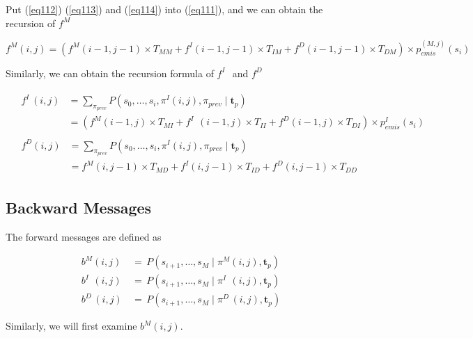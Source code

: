 \documentclass[10pt]{article}
\begin{document}
    Put (\ref{eq112}) (\ref{eq113}) and (\ref{eq114}) into (\ref{eq111}), and we can obtain the recursion of $f^{M}$
    
    \begin{equation} \label{eq115}
      f^{M}(i, j) = (f^{M}(i-1, j-1) \times T_{MM}  + f^{I}(i-1, j-1) \times T_{IM} + f^{D}(i-1, j-1) \times T_{DM}) \times p_{emis}^{(M, j)}(s_{i})
    \end{equation}

    Similarly, we can obtain the recursion formula of $f^{I\;\;}$ and $f^{D\;}$

    \begin{align}
      &\begin{aligned} \label{eq116}
        f^{I\;}(i, j) &= \sum\nolimits_{\pi_{prev}} P(s_0, \dots,s_{i}, \pi^{I}(i, j), \pi_{prev} \;|\; \mathbf{t}_{p}) \\
                    &= (f^{M}(i-1, j) \times T_{MI}  + f^{I\;\;}(i-1, j) \times T_{II} + f^{D}(i-1, j) \times T_{DI}) \times p_{emis}^{I}(s_{i})
      \end{aligned} \\
      &\begin{aligned} \label{eq117}
        f^{D}(i, j) &= \sum\nolimits_{\pi_{prev}} P(s_0, \dots,s_{i}, \pi^{I}(i, j), \pi_{prev} \;|\; \mathbf{t}_{p}) \\
                    &= f^{M}(i, j-1) \times T_{MD}  + f^{I}(i, j-1) \times T_{ID} + f^{D}(i, j-1) \times T_{DD}
      \end{aligned}
    \end{align}

  \subsection{Backward Messages}

    The forward messages are defined as

    \begin{equation}
    \begin{aligned}
      b^{M}(i, j) \,&=\, P(s_{i+1}, \dots,s_M \;|\; \pi^M(i, j), \mathbf{t}_{p}) \\
      b^{I\;\;}(i, j) \,&=\, P(s_{i+1}, \dots,s_M \;|\; \pi^{I\;\;}(i, j), \mathbf{t}_{p}) \\
      b^{D\;}(i, j) \,&=\, P(s_{i+1}, \dots,s_M \;|\; \pi^{D\;}(i, j), \mathbf{t}_{p})
    \end{aligned}
    \end{equation}

    Similarly, we will first examine $b^{M}(i, j)$.
\end{document}
